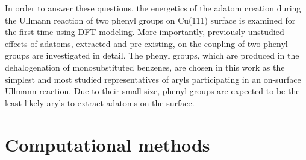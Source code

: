 \documentclass[%
 reprint,
 amsmath,amssymb,
 aps,
prb,
floatfix,
]{revtex4-2}
\newcommand{\lock}{\color{red}}
\newcommand{\lock}{\color{red}}
\begin{document}
\fi

{\lock

In order to answer these questions, the energetics of the adatom creation during the Ullmann reaction of two phenyl groups on Cu(111) surface is examined for the first time using DFT modeling. 
More importantly, previously unstudied effects of adatoms, extracted and pre-existing, on the coupling of two phenyl groups are investigated in detail. 
The phenyl groups, which are produced in the dehalogenation of monosubstituted benzenes, are chosen in this work as the simplest and most studied representatives of aryls participating in an on-surface Ullmann reaction. Due to their small size, phenyl groups are expected to be the least likely aryls to extract adatoms on the surface.




}

\section{Computational methods}
\end{document}
